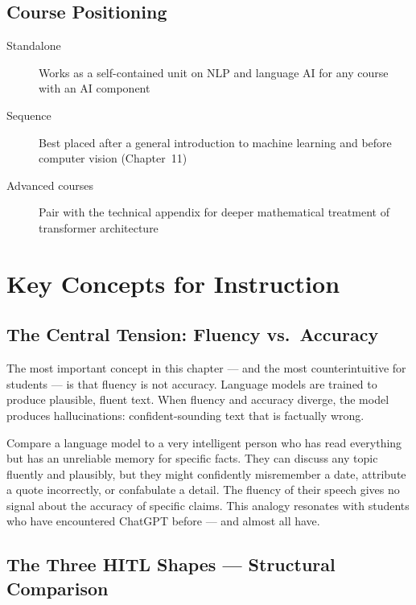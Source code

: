 \subsection{Course Positioning}

\begin{description}
    \item[Standalone] Works as a self-contained unit on NLP and language AI for any course with an AI component
    \item[Sequence] Best placed after a general introduction to machine learning and before computer vision (Chapter~11)
    \item[Advanced courses] Pair with the technical appendix for deeper mathematical treatment of transformer architecture
\end{description}

\section{Key Concepts for Instruction}

\subsection{The Central Tension: Fluency vs.\ Accuracy}

The most important concept in this chapter --- and the most counterintuitive for students --- is that fluency is not accuracy. Language models are trained to produce plausible, fluent text. When fluency and accuracy diverge, the model produces hallucinations: confident-sounding text that is factually wrong.

\begin{technote}
Compare a language model to a very intelligent person who has read everything but has an unreliable memory for specific facts. They can discuss any topic fluently and plausibly, but they might confidently misremember a date, attribute a quote incorrectly, or confabulate a detail. The fluency of their speech gives no signal about the accuracy of specific claims. This analogy resonates with students who have encountered ChatGPT before --- and almost all have.
\end{technote}

\subsection{The Three HITL Shapes --- Structural Comparison}

